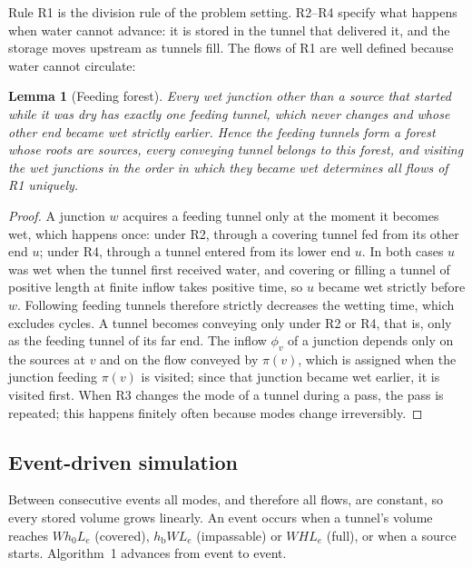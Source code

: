\documentclass[11pt,a4paper]{article}
\theoremstyle{plain}
\newtheorem{lemma}{Lemma}
\theoremstyle{definition}
\theoremstyle{remark}
\newcommand{\hb}{h_{\mathrm{b}}}
\begin{document}
Rule R1 is the division rule of the problem setting. R2--R4 specify what happens when water cannot advance: it is stored in the tunnel that delivered it, and the storage moves upstream as tunnels fill. The flows of R1 are well defined because water cannot circulate:

\begin{lemma}[Feeding forest]\label{lem:forest}
Every wet junction other than a source that started while it was dry has exactly one feeding tunnel, which never changes and whose other end became wet strictly earlier. Hence the feeding tunnels form a forest whose roots are sources, every conveying tunnel belongs to this forest, and visiting the wet junctions in the order in which they became wet determines all flows of R1 uniquely.
\end{lemma}
\begin{proof}
A junction $w$ acquires a feeding tunnel only at the moment it becomes wet, which happens once: under R2, through a covering tunnel fed from its other end $u$; under R4, through a tunnel entered from its lower end $u$. In both cases $u$ was wet when the tunnel first received water, and covering or filling a tunnel of positive length at finite inflow takes positive time, so $u$ became wet strictly before $w$. Following feeding tunnels therefore strictly decreases the wetting time, which excludes cycles. A tunnel becomes conveying only under R2 or R4, that is, only as the feeding tunnel of its far end. The inflow $\phi_v$ of a junction depends only on the sources at $v$ and on the flow conveyed by $\pi(v)$, which is assigned when the junction feeding $\pi(v)$ is visited; since that junction became wet earlier, it is visited first. When R3 changes the mode of a tunnel during a pass, the pass is repeated; this happens finitely often because modes change irreversibly.
\end{proof}

\subsection{Event-driven simulation}

Between consecutive events all modes, and therefore all flows, are constant, so every stored volume grows linearly. An event occurs when a tunnel's volume reaches $W h_0 L_e$ (covered), $\hb W L_e$ (impassable) or $W H L_e$ (full), or when a source starts. Algorithm~1 advances from event to event.
\end{document}
